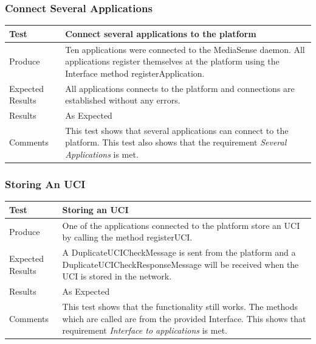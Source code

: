 \subsubsection{Connect Several Applications}
\begin{center}
    \begin{tabular}{ | l | p{12cm} |}
    \hline
    Test 	 				& 		 Connect several applications to the platform\\ \hline
	Produce  				& 		 Ten applications were connected to the MediaSense daemon. All applications register themselves at the platform using the Interface method registerApplication.\\ \hline
	Expected Results  		& 		 All applications connects to the platform and connections are established without any errors.\\ \hline
	Results 				& 		 As Expected\\ \hline
	Comments				& 		 This test shows that several applications can connect to the platform. This test also shows that the requirement \emph{Several Applications} is met.\\ \hline
    \end{tabular}
\end{center}

\subsubsection{Storing An UCI}
\begin{center}
    \begin{tabular}{ | l | p{12cm} |}
    \hline
    Test 	 				& 		 Storing an UCI\\ \hline
	Produce  				& 		 One of the applications connected to the platform store an UCI by calling the method registerUCI.\\ \hline
	Expected Results  		& 		 A DuplicateUCICheckMessage is sent from the platform and a DuplicateUCICheckResponseMessage will be received when the UCI is stored in the network.\\ \hline
	Results 				& 		 As Expected\\ \hline
	Comments				& 		 This test shows that the functionality still works. The methods which are called are from the provided Interface. This shows that requirement \emph{Interface to applications} is met.\\ \hline
    \end{tabular}
\end{center}

